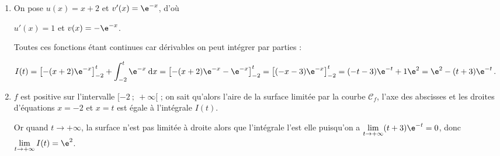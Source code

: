 \begin{enumerate}
	\begin{enumerate}
		\item %
On pose $u(x) = x + 2$ et $v'(x) = \e^{-x}$, d'où	

$u'(x) = 1$ et $v(x) = - \e^{-x}$.

Toutes ces fonctions étant continues car dérivables on peut intégrer par parties :

$I(t) = \left[-(x + 2)\e^{-x} \right]_{-2}^t + \displaystyle\int_{-2}^t \e^{-x}\:\text{d}x = \left[-(x + 2)\e^{-x}- \e^{-x}\right]_{-2}^t = \left[(- x - 3) \e^{-x} \right]_{-2}^t = (- t - 3) \e^{-t} +1 \e^{2} = \e^{2} - (t + 3)\e^{-t}$.

		\item %
$f$ est positive sur l'intervalle $[-2~;~+ \infty[$ ; on sait qu'alors l'aire de la surface limitée par la courbe $\mathcal{C}_f$, l'axe des abscisses et les droites d'équations $x = - 2$ et $x = t$ est égale à l'intégrale $I(t)$.

Or quand $t \to + \infty$, la surface n'est pas limitée à droite alors que l'intégrale l'est elle puisqu'on a $\displaystyle\lim_{t \to + \infty} (t + 3)\e^{- t} = 0$, donc $\displaystyle\lim_{t \to + \infty} I(t) = \e^2$.
	\end{enumerate}
\end{enumerate}
